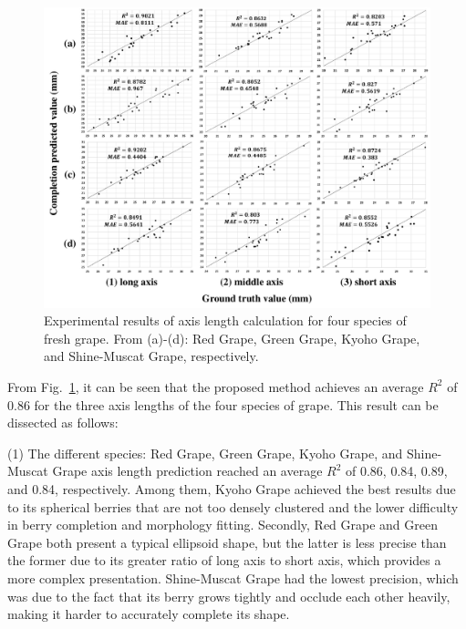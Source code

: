 \documentclass[12pt]{article}
\begin{document}
\begin{figure}[hbt!]
    \centering
    \includegraphics[width=1\textwidth]{figures/Figure14.pdf}
    \caption{Experimental results of axis length calculation for four species of fresh grape. From (a)-(d): Red Grape, Green Grape, Kyoho Grape, and Shine-Muscat Grape, respectively. }
    \label{fig:raw17}
\end{figure}

From Fig.~\ref{fig:raw17}, it can be seen that the proposed method achieves an average $R^2$ of 0.86 for the three axis lengths of the four species of grape. 
This result can be dissected as follows:

(1) The different species: Red Grape, Green Grape, Kyoho Grape, and Shine-Muscat Grape axis length prediction reached an average $R^2$ of 0.86, 0.84, 0.89, and 0.84, respectively. 
Among them, Kyoho Grape achieved the best results due to its spherical berries that are not too densely clustered and the lower difficulty in berry completion and morphology fitting. 
Secondly, Red Grape and Green Grape both present a typical ellipsoid shape, but the latter is less precise than the former due to its greater ratio of long axis to short axis, which provides a more complex presentation. 
Shine-Muscat Grape had the lowest precision, which was due to the fact that its berry grows tightly and occlude each other heavily, making it harder to accurately complete its shape.
\end{document}
